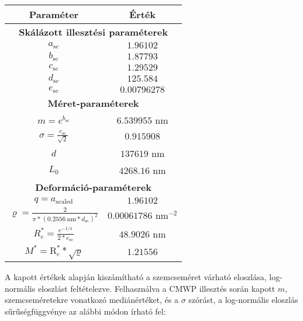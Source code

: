 \begin{multicols}{2}
\begin{center}
\begin{tabular}{|c|c|}
\hline
Paraméter                                                                        & Érték                 \\ \hline \hline
\multicolumn{2}{|c|}{\textbf{Skálázott illesztési paraméterek}}                                          \\ \hline
$a_{\text{sc}}$                                                                  & $1.96102$             \\
$b_{\text{sc}}$                                                                  & $1.87793$             \\
$c_{\text{sc}}$                                                                  & $1.29529$             \\
$d_{\text{sc}}$                                                                  & $125.584$             \\
$e_{\text{sc}}$                                                                  & $0.00796278$          \\ \hline
\multicolumn{2}{|c|}{\textbf{Méret-paraméterek}}                                                         \\ \hline
$m = e^{b_{\text{sc}}}$                                                          & $6.539955$ nm         \\
$\sigma = \frac{c_{\text{sc}}}{\sqrt{2}}$                                        & $0.915908$            \\
$d$                                                                              & $137619$ nm           \\
$L_{0}$                                                                          & $4268.16$ nm          \\ \hline
\multicolumn{2}{|c|}{\textbf{Deformáció-paraméterek}}                                                    \\ \hline
$q = a_{\text{scaled}}$                                                          & $1.96102$             \\
$\varrho = \frac{2}{\pi * \left( 0.2556\ \text{nm} * d_{\text{sc}} \right)^{2}}$ & $0.00061786$ nm$^{-2}$\\
$R_{e}^{\ast} = \frac{e^{-1/4}}{2 * e_{\text{sc}}}$                              & $48.9026$ nm          \\
$M^{\ast} = \text{R}_{e}^{\ast} * \sqrt{\varrho}$                                & $1.21556$             \\ \hline
\end{tabular}
\end{center}
A kapott értékek alapján kiszámítható a szemcseméret várható eloszlása, log-normális eloszlást feltételezve. Felhasználva a CMWP illesztés során kapott $m$, szemcseméretekre vonatkozó mediánértéket, és a $\sigma$ szórást, a log-normális eloszlás sűrűségfüggvénye az alábbi módon írható fel:


\end{multicols}
